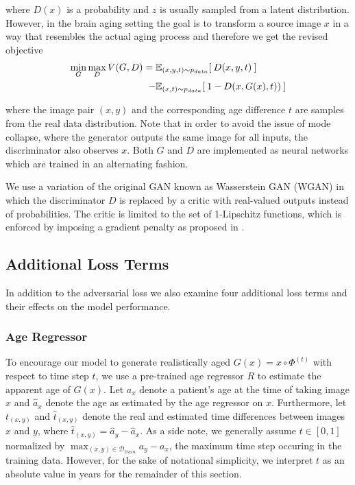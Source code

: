where $D(x)$ is a probability and $z$ is usually sampled from a latent distribution. However, in the brain aging setting the goal is to transform a source image $x$ in a way that resembles the actual aging process and therefore we get the revised objective
\begin{equation}
	\begin{split}
		\min_G \max_D V(G, D) = \; & \mathbb{E}_{ (x, y, t) \sim p_{data} } [ \: D (x, y, t) \: ] \\
		 - & \mathbb{E}_{ (x, t) \sim p_{data} } [ \: 1 - D (x, G(x), t)) \: ]
	\end{split}
\end{equation}

where the image pair $(x, y)$ and the corresponding age difference $t$ are samples from the real data distribution. Note that in order to avoid the issue of mode collapse, where the generator outputs the same image for all inputs, the discriminator also observes $x$. Both $G$ and $D$ are implemented as neural networks which are trained in an alternating fashion. 

We use a variation of the original GAN known as Wasserstein GAN (WGAN) \cite{arjovsky} in which the discriminator $D$ is replaced by a critic with real-valued outputs instead of probabilities. The critic is limited to the set of 1-Lipschitz functions, which is enforced by imposing a gradient penalty as proposed in \cite{gulrajani}.

\subsection{Additional Loss Terms}
In addition to the adversarial loss we also examine four additional loss terms and their effects on the model performance.

\subsubsection*{Age Regressor}
To encourage our model to generate realistically aged $G(x) = x \circ \Phi^{(t)} $ with respect to time step $t$, we use a pre-trained age regressor $R$ to estimate the apparent age of $G(x)$.
Let $ a_x $ denote a patient's age at the time of taking image $x$ and $ \hat a_x $ denote the age as estimated by the age regressor on $x$. Furthermore, let $ t_{(x, y)} $ and $ \hat t_{(x, y)} $ denote the real and estimated time differences between images $x$ and $y$, where $ \hat t_{(x, y)} = \hat a_y - \hat a_x $. As a side note, we generally assume $t \in [0, 1]$ normalized by $\max_{(x, y) \in \mathcal{D}_{train}} a_y - a_x $, the maximum time step occuring in the training data. However, for the sake of notational simplicity, we interpret $t$ as an absolute value in years for the remainder of this section.

